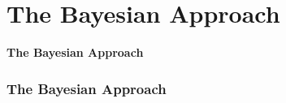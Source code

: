 \section{The Bayesian Approach}
\begin{frame}[plain, c]
    \begin{center}
        \Huge \textcolor{NavyBlue}{\textbf{The Bayesian Approach}}
    \end{center}
\end{frame}

\begin{frame}
    \frametitle{The Bayesian Approach}
\end{frame}